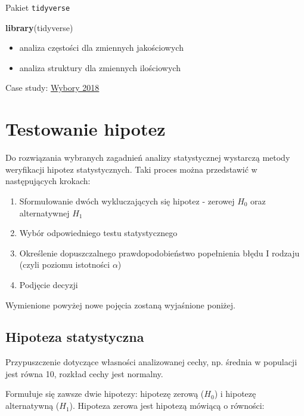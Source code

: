 \documentclass[]{book}
\newenvironment{Shaded}{\begin{snugshade}}{\end{snugshade}}
\newcommand{\KeywordTok}[1]{\textcolor[rgb]{0.13,0.29,0.53}{\textbf{#1}}}
\newcommand{\NormalTok}[1]{#1}
\providecommand{\tightlist}{%
  \setlength{\itemsep}{0pt}\setlength{\parskip}{0pt}}
\begin{document}
Pakiet \texttt{tidyverse}

\begin{Shaded}
\begin{Highlighting}[]
\KeywordTok{library}\NormalTok{(tidyverse)}
\end{Highlighting}
\end{Shaded}

\begin{itemize}
\tightlist
\item
  analiza częstości dla zmiennych jakościowych
\item
  analiza struktury dla zmiennych ilościowych
\end{itemize}

Case study: \href{data/wybory2018.xlsx}{Wybory 2018}

\hypertarget{testowanie-hipotez}{%
\chapter{Testowanie hipotez}\label{testowanie-hipotez}}

Do rozwiązania wybranych zagadnień analizy statystycznej wystarczą metody weryfikacji hipotez statystycznych. Taki proces można przedstawić w następujących krokach:

\begin{enumerate}
\def\labelenumi{\arabic{enumi}.}
\tightlist
\item
  Sformułowanie dwóch wykluczających się hipotez - zerowej \(H_0\) oraz alternatywnej \(H_1\)
\item
  Wybór odpowiedniego testu statystycznego
\item
  Określenie dopuszczalnego prawdopodobieństwo popełnienia błędu I rodzaju (czyli poziomu istotności \(\alpha\))
\item
  Podjęcie decyzji
\end{enumerate}

Wymienione powyżej nowe pojęcia zostaną wyjaśnione poniżej.

\hypertarget{hipoteza-statystyczna}{%
\section{Hipoteza statystyczna}\label{hipoteza-statystyczna}}

Przypuszczenie dotyczące własności analizowanej cechy, np. średnia w populacji jest równa 10, rozkład cechy jest normalny.

Formułuje się zawsze dwie hipotezy: hipotezę zerową (\(H_0\)) i hipotezę alternatywną (\(H_1\)). Hipoteza zerowa jest hipotezą mówiącą o równości:
\end{document}
